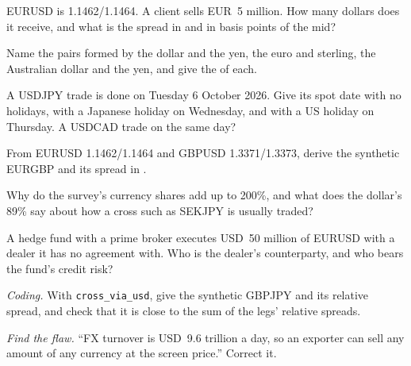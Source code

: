 \begin{exercise}[$\star$]\label{exo:m2:the-fx-market:1}
EURUSD is 1.1462/1.1464. A client sells EUR~5 million. How many dollars does
it receive, and what is the spread in  and in basis points of the mid?
\end{exercise}

\begin{exercise}[$\star$]\label{exo:m2:the-fx-market:2}
Name the pairs formed by the dollar and the yen, the euro and sterling, the
Australian dollar and the yen, and give the  of each.
\end{exercise}

\begin{exercise}[$\star$]\label{exo:m2:the-fx-market:3}
A USDJPY trade is done on Tuesday 6 October 2026. Give its spot date with no
holidays, with a Japanese holiday on Wednesday, and with a US holiday on
Thursday. A USDCAD trade on the same day?
\end{exercise}

\begin{exercise}[$\star\star$]\label{exo:m2:the-fx-market:4}
From EURUSD 1.1462/1.1464 and GBPUSD 1.3371/1.3373, derive the synthetic EURGBP
and its spread in .
\end{exercise}

\begin{exercise}[$\star\star$]\label{exo:m2:the-fx-market:5}
Why do the survey's currency shares add up to 200\%, and what does the dollar's
89\% say about how a cross such as SEKJPY is usually traded?
\end{exercise}

\begin{exercise}[$\star\star$]\label{exo:m2:the-fx-market:6}
A hedge fund with a prime broker executes USD~50 million of EURUSD with a
dealer it has no agreement with. Who is the dealer's counterparty, and who
bears the fund's credit risk?
\end{exercise}

\begin{exercise}[$\star\star\star$]\label{exo:m2:the-fx-market:7}
\emph{Coding.} With \texttt{cross\_via\_usd}, give the synthetic GBPJPY and its
relative spread, and check that it is close to the sum of the legs' relative
spreads.
\end{exercise}

\begin{exercise}[$\star\star\star$]\label{exo:m2:the-fx-market:8}
\emph{Find the flaw.} ``FX turnover is USD~9.6 trillion a day, so an exporter
can sell any amount of any currency at the screen price.'' Correct it.
\end{exercise}

